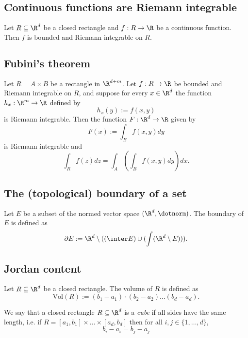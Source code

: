 \subsection{Continuous functions are Riemann integrable}
\begin{theorem}
    Let $R \subseteq \R^d$ be a closed rectangle and $f: R \to \R$ be a continuous function.
    Then $f$ is bounded and Riemann integrable on $R$.
\end{theorem}

\subsection{Fubini's theorem}
\begin{theorem}[Fubini]
    Let $R = A \times B$ be a rectangle in $\R^{d+m}$. Let $f: R \to \R$ be bounded
    and Riemann integrable on $R$, and suppose for every $x \in \R^d$ the function
    $h_x:\R^m \to \R$ defined by
    $$h_x(y) := f(x,y)$$
    is Riemann integrable. Then the function $F: \R^d \to \R$ given by
    $$F(x) := \int_Bf(x,y)dy$$
    is Riemann integrable and
    $$\int_Rf(z)dz = \int_A\left(\int_Bf(x,y)dy\right)dx.$$
\end{theorem}

\subsection{The (topological) boundary of a set}
\begin{definition}
    Let $E$ be a subset of the normed vector space $(\R^d, \dotnorm)$. The boundary of $E$
    is defined as
    $$\partial E:=\R^d\setminus((\inter E) \cup (\int(\R^d\setminus E))).$$
\end{definition}

\subsection{Jordan content}
\begin{definition}
    Let $R \subseteq \R^d$ be a closed rectangle. The volume of $R$ is defined as
    $$\text{Vol}(R) := (b_1-a_1)\cdot(b_2-a_2)\dots(b_d-a_d).$$
\end{definition}

\begin{definition}[Cube]
    We say that a closed rectangle $R \subseteq \R^d$ is a \emph{cube} if all
    sides have the same length, i.e. if
    $R = [a_1,b_1] \times \dots \times [a_d,b_d]$
    then for all $i,j \in \{1,\dots,d\}$,
    $$b_i - a_i = b_j - a_j$$
\end{definition}

